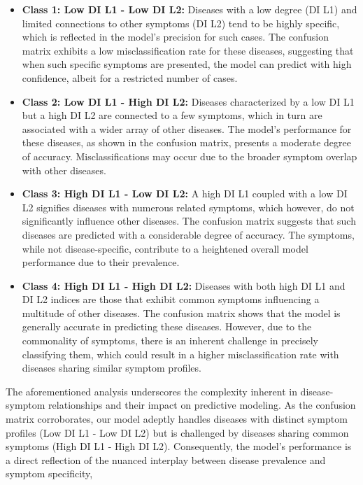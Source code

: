 \begin{itemize}
	\item \textbf{Class 1: Low DI L1 - Low DI L2:} Diseases with a low degree (DI L1) and limited connections to other symptoms (DI L2)
	      tend to be highly specific, which is reflected in the model's precision for such cases.
	      The confusion matrix exhibits a low misclassification rate for these diseases,
	      suggesting that when such specific symptoms are presented, the model can predict with high confidence,
	      albeit for a restricted number of cases.

	\item \textbf{Class 2: Low DI L1 - High DI L2:} Diseases characterized by a low DI L1 but a high DI L2 are connected to a few symptoms,
	      which in turn are associated with a wider array of other diseases. The model's performance for these diseases,
	      as shown in the confusion matrix, presents a moderate degree of accuracy.
	      Misclassifications may occur due to the broader symptom overlap with other diseases.

	\item \textbf{Class 3: High DI L1 - Low DI L2:} A high DI L1 coupled with a low DI L2 signifies diseases with numerous related symptoms,
	      which however, do not significantly influence other diseases.
	      The confusion matrix suggests that such diseases are predicted with a considerable degree of accuracy.
	      The symptoms, while not disease-specific, contribute to a heightened overall model performance due to their prevalence.

	\item \textbf{Class 4: High DI L1 - High DI L2:} Diseases with both high DI L1 and DI L2 indices are those that exhibit common symptoms
	      influencing a multitude of other diseases. The confusion matrix shows that the model is generally accurate in predicting these diseases.
	      However, due to the commonality of symptoms, there is an inherent challenge in precisely classifying them,
	      which could result in a higher misclassification rate with diseases sharing similar symptom profiles.
\end{itemize}
\noindent
The aforementioned analysis underscores the complexity inherent in disease-symptom relationships and their impact on predictive modeling.
As the confusion matrix corroborates, our model adeptly handles diseases with distinct symptom profiles (Low DI L1 - Low DI L2)
but is challenged by diseases sharing common symptoms (High DI L1 - High DI L2).
Consequently, the model's performance is a direct reflection of the nuanced interplay between disease prevalence and symptom specificity,
